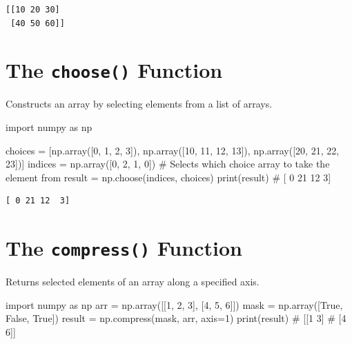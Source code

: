 \documentclass[
  english,
  letterpaper,
  DIV=11,
  numbers=noendperiod]{scrreprt}
\newenvironment{Shaded}{\begin{snugshade}}{\end{snugshade}}
\newcommand{\BuiltInTok}[1]{\textcolor[rgb]{0.00,0.23,0.31}{#1}}
\newcommand{\CommentTok}[1]{\textcolor[rgb]{0.37,0.37,0.37}{#1}}
\newcommand{\DecValTok}[1]{\textcolor[rgb]{0.68,0.00,0.00}{#1}}
\newcommand{\ImportTok}[1]{\textcolor[rgb]{0.00,0.46,0.62}{#1}}
\newcommand{\NormalTok}[1]{\textcolor[rgb]{0.00,0.23,0.31}{#1}}
\newcommand{\OperatorTok}[1]{\textcolor[rgb]{0.37,0.37,0.37}{#1}}
\newcommand{\VariableTok}[1]{\textcolor[rgb]{0.07,0.07,0.07}{#1}}
\begin{document}
\begin{verbatim}
[[10 20 30]
 [40 50 60]]
\end{verbatim}

\section{\texorpdfstring{The \texttt{choose()}
Function}{The choose() Function}}\label{the-choose-function}

Constructs an array by selecting elements from a list of arrays.

\begin{Shaded}
\begin{Highlighting}[]
\ImportTok{import}\NormalTok{ numpy }\ImportTok{as}\NormalTok{ np}

\NormalTok{choices }\OperatorTok{=}\NormalTok{ [np.array([}\DecValTok{0}\NormalTok{, }\DecValTok{1}\NormalTok{, }\DecValTok{2}\NormalTok{, }\DecValTok{3}\NormalTok{]),}
\NormalTok{         np.array([}\DecValTok{10}\NormalTok{, }\DecValTok{11}\NormalTok{, }\DecValTok{12}\NormalTok{, }\DecValTok{13}\NormalTok{]),}
\NormalTok{         np.array([}\DecValTok{20}\NormalTok{, }\DecValTok{21}\NormalTok{, }\DecValTok{22}\NormalTok{, }\DecValTok{23}\NormalTok{])]}
\NormalTok{indices }\OperatorTok{=}\NormalTok{ np.array([}\DecValTok{0}\NormalTok{, }\DecValTok{2}\NormalTok{, }\DecValTok{1}\NormalTok{, }\DecValTok{0}\NormalTok{])  }\CommentTok{\# Selects which choice array to take the element from}
\NormalTok{result }\OperatorTok{=}\NormalTok{ np.choose(indices, choices)}
\BuiltInTok{print}\NormalTok{(result)  }\CommentTok{\# [ 0 21 12  3]}
\end{Highlighting}
\end{Shaded}

\begin{verbatim}
[ 0 21 12  3]
\end{verbatim}

\section{\texorpdfstring{The \texttt{compress()}
Function}{The compress() Function}}\label{the-compress-function}

Returns selected elements of an array along a specified axis.

\begin{Shaded}
\begin{Highlighting}[]
\ImportTok{import}\NormalTok{ numpy }\ImportTok{as}\NormalTok{ np}
\NormalTok{arr }\OperatorTok{=}\NormalTok{ np.array([[}\DecValTok{1}\NormalTok{, }\DecValTok{2}\NormalTok{, }\DecValTok{3}\NormalTok{], [}\DecValTok{4}\NormalTok{, }\DecValTok{5}\NormalTok{, }\DecValTok{6}\NormalTok{]])}
\NormalTok{mask }\OperatorTok{=}\NormalTok{ np.array([}\VariableTok{True}\NormalTok{, }\VariableTok{False}\NormalTok{, }\VariableTok{True}\NormalTok{])}
\NormalTok{result }\OperatorTok{=}\NormalTok{ np.compress(mask, arr, axis}\OperatorTok{=}\DecValTok{1}\NormalTok{)}
\BuiltInTok{print}\NormalTok{(result)}
\CommentTok{\# [[1 3]}
\CommentTok{\#  [4 6]]}
\end{Highlighting}
\end{Shaded}
\end{document}
